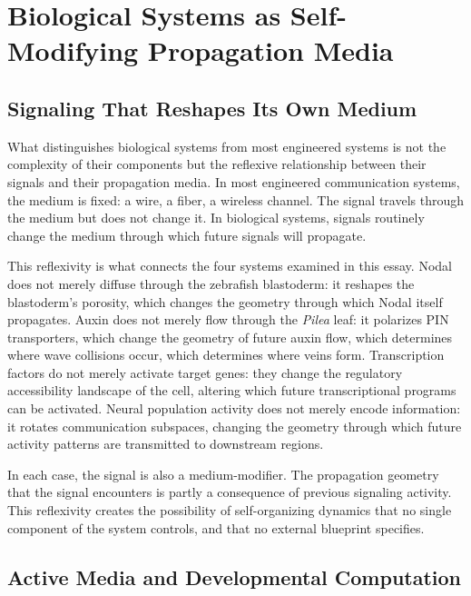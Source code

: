 \documentclass[12pt, a4paper, openany]{book}
\theoremstyle{definition}
\theoremstyle{remark}
\begin{document}

\chapter{Biological Systems as Self-Modifying Propagation Media}

\section{Signaling That Reshapes Its Own Medium}

What distinguishes biological systems from most engineered systems is not the complexity of their components but the reflexive relationship between their signals and their propagation media. In most engineered communication systems, the medium is fixed: a wire, a fiber, a wireless channel. The signal travels through the medium but does not change it. In biological systems, signals routinely change the medium through which future signals will propagate.

This reflexivity is what connects the four systems examined in this essay. Nodal does not merely diffuse through the zebrafish blastoderm: it reshapes the blastoderm's porosity, which changes the geometry through which Nodal itself propagates. Auxin does not merely flow through the \textit{Pilea} leaf: it polarizes PIN transporters, which change the geometry of future auxin flow, which determines where wave collisions occur, which determines where veins form. Transcription factors do not merely activate target genes: they change the regulatory accessibility landscape of the cell, altering which future transcriptional programs can be activated. Neural population activity does not merely encode information: it rotates communication subspaces, changing the geometry through which future activity patterns are transmitted to downstream regions.

In each case, the signal is also a medium-modifier. The propagation geometry that the signal encounters is partly a consequence of previous signaling activity. This reflexivity creates the possibility of self-organizing dynamics that no single component of the system controls, and that no external blueprint specifies.

\section{Active Media and Developmental Computation}
\end{document}
